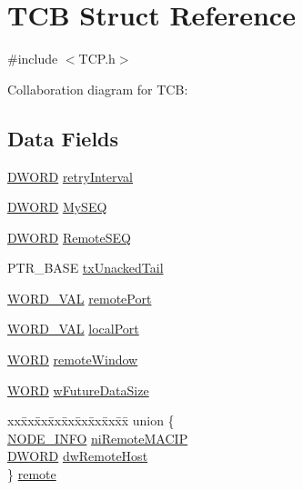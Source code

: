 \hypertarget{struct_t_c_b}{}\section{T\+C\+B Struct Reference}
\label{struct_t_c_b}


{\ttfamily \#include $<$T\+C\+P.\+h$>$}



Collaboration diagram for T\+C\+B\+:
\subsection*{Data Fields}
\begin{DoxyCompactItemize}
\item 
\hyperlink{_generic_type_defs_8h_ad342ac907eb044443153a22f964bf0af}{D\+W\+O\+R\+D} \hyperlink{struct_t_c_b_a807f78c2939992452223356ae72340cf}{retry\+Interval}
\item 
\hyperlink{_generic_type_defs_8h_ad342ac907eb044443153a22f964bf0af}{D\+W\+O\+R\+D} \hyperlink{struct_t_c_b_ab1e41ee8fe38bfb894ab8035087a3aeb}{My\+S\+E\+Q}
\item 
\hyperlink{_generic_type_defs_8h_ad342ac907eb044443153a22f964bf0af}{D\+W\+O\+R\+D} \hyperlink{struct_t_c_b_ad819775df364f9ddf85d4568ffe1ed18}{Remote\+S\+E\+Q}
\item 
P\+T\+R\+\_\+\+B\+A\+S\+E \hyperlink{struct_t_c_b_a6a6329eb22236074b0f6b501ef3fdedf}{tx\+Unacked\+Tail}
\item 
\hyperlink{union_w_o_r_d___v_a_l}{W\+O\+R\+D\+\_\+\+V\+A\+L} \hyperlink{struct_t_c_b_aa316e3d5bcdbc999280ce3bb80ef116e}{remote\+Port}
\item 
\hyperlink{union_w_o_r_d___v_a_l}{W\+O\+R\+D\+\_\+\+V\+A\+L} \hyperlink{struct_t_c_b_aa71085d8339f25c6ebce50737f9e58fb}{local\+Port}
\item 
\hyperlink{_generic_type_defs_8h_a2b0e863dadf920709ec53d9088ee7c91}{W\+O\+R\+D} \hyperlink{struct_t_c_b_a856e07e4c4285f8a0f28518aed9fc2bd}{remote\+Window}
\item 
\hyperlink{_generic_type_defs_8h_a2b0e863dadf920709ec53d9088ee7c91}{W\+O\+R\+D} \hyperlink{struct_t_c_b_a48cb8cf682effdf9221fef77ae582298}{w\+Future\+Data\+Size}
\item 
\begin{tabbing}
xx\=xx\=xx\=xx\=xx\=xx\=xx\=xx\=xx\=\kill
union \{\\
\>\hyperlink{_stack_tsk_8h_ac28a7d4076195ab8e3376f06055f8ee4}{NODE\_INFO} \hyperlink{struct_t_c_b_a1bf5ec3f0c3c0241d01cc1b5e7f094cd}{niRemoteMACIP}\\
\>\hyperlink{_generic_type_defs_8h_ad342ac907eb044443153a22f964bf0af}{DWORD} \hyperlink{struct_t_c_b_a3f09cd8c9167b802029195c759770966}{dwRemoteHost}\\
\} \hyperlink{struct_t_c_b_afadd907b992146d3bcfb2f95cc670731}{remote}\\


\end{tabbing}
\end{DoxyCompactItemize}
